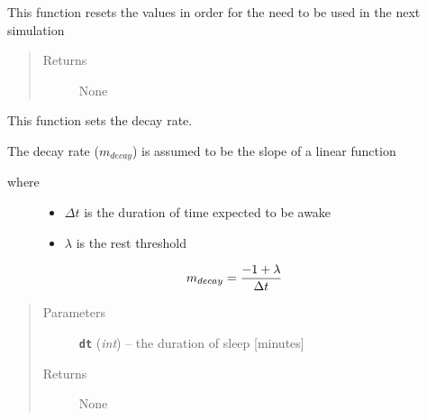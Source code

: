 \documentclass[letterpaper,10pt,english]{sphinxmanual}
\begin{document}
\begin{fulllineitems}
\begin{fulllineitems}
\end{fulllineitems}


\begin{fulllineitems}
\label{rest:rest.Rest.reset}
This function resets the values in order for the need to be used in the next simulation
\begin{quote}\begin{description}
\item[{Returns}] \leavevmode
None

\end{description}\end{quote}

\end{fulllineitems}


\begin{fulllineitems}
\label{rest:rest.Rest.set_decay_rate}
This function sets the decay rate.

The decay rate (\(m_{decay}\)) is assumed to be the slope of a linear function
\begin{description}
\item[{where}] \leavevmode\begin{itemize}
\item {} 
\(\Delta{t}\) is the duration of time expected to be awake

\item {} 
\(\lambda\) is the rest threshold

\end{itemize}

\end{description}
\begin{gather}
\begin{split}m_{decay} = \frac{-1 + \lambda}{\Delta{t}}\end{split}\notag
\end{gather}\begin{quote}\begin{description}
\item[{Parameters}] \leavevmode
\textbf{\texttt{dt}} (\emph{int}) -- the duration of sleep {[}minutes{]}

\item[{Returns}] \leavevmode
None

\end{description}\end{quote}


\end{fulllineitems}
\end{fulllineitems}
\end{document}
